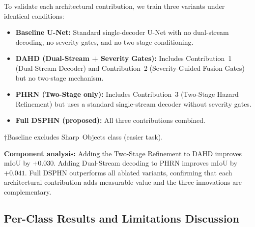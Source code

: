 To validate each architectural contribution, we train three
variants under identical conditions:

\begin{itemize}
\item \textbf{Baseline U-Net:} Standard single-decoder U-Net with
no dual-stream decoding, no severity gates, and no two-stage
conditioning.
\item \textbf{DAHD (Dual-Stream + Severity Gates):} Includes
Contribution~1 (Dual-Stream Decoder) and Contribution~2
(Severity-Guided Fusion Gates) but no two-stage mechanism.
\item \textbf{PHRN (Two-Stage only):} Includes Contribution~3
(Two-Stage Hazard Refinement) but uses a standard single-stream
decoder without severity gates.
\item \textbf{Full DSPHN (proposed):} All three contributions
combined.
\end{itemize}

\begin{table}[h]
\centering
\caption{Ablation Study: Each Architectural Contribution (Test Set)}
\label{tab:ablation}
\end{table}

\noindent\small{†Baseline excludes Sharp~Objects class (easier task).}

\noindent\textbf{Component analysis:}
Adding the Two-Stage Refinement to DAHD improves mIoU by $+0.030$.
Adding Dual-Stream decoding to PHRN improves mIoU by $+0.041$.
Full DSPHN outperforms all ablated variants, confirming that each
architectural contribution adds measurable value and the three
innovations are complementary.

\subsection{Per-Class Results and Limitations Discussion}

